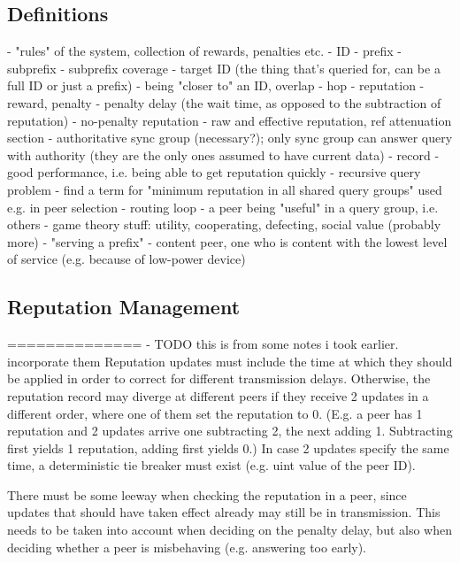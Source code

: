 \subsection{Definitions}
- "rules" of the system, collection of rewards, penalties etc.
- ID
- prefix
- subprefix
- subprefix coverage
- target ID (the thing that's queried for, can be a full ID or just a prefix)
- being "closer to" an ID, overlap
- hop
- reputation
- reward, penalty
- penalty delay (the wait time, as opposed to the subtraction of reputation)
- no-penalty reputation
- raw and effective reputation, ref attenuation section
- authoritative sync group (necessary?); only sync group can answer query with
  authority (they are the only ones assumed to have current data)
- record
- good performance, i.e. being able to get reputation quickly
- recursive query problem
- find a term for "minimum reputation in all shared query groups" used e.g. in
  peer selection
- routing loop
- a peer being "useful" in a query group, i.e. others
- game theory stuff: utility, cooperating, defecting, social value (probably
  more)
- "serving a prefix"
- content peer, one who is content with the lowest level of service (e.g.
  because of low-power device)
\subsection{Reputation Management}
==============
- TODO this is from some notes i took earlier. incorporate them
Reputation updates must include the time at which they should be applied in
order to correct for different transmission delays. Otherwise, the reputation
record may diverge at different peers if they receive 2 updates in a different
order, where one of them set the reputation to 0. (E.g. a peer has 1 reputation
and 2 updates arrive one subtracting 2, the next adding 1. Subtracting first
yields 1 reputation, adding first yields 0.) In case 2 updates specify the same
time, a deterministic tie breaker must exist (e.g. uint value of the peer ID).

There must be some leeway when checking the reputation in a peer, since updates
that should have taken effect already may still be in transmission. This needs
to be taken into account when deciding on the penalty delay, but also when
deciding whether a peer is misbehaving (e.g. answering too early).

